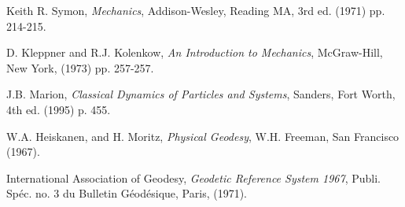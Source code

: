 \documentclass{revtex4}
\begin{document}
\begin{thebibliography}{9}

 Keith R. Symon,
 \emph{Mechanics},
 Addison-Wesley, Reading MA, 
 3rd ed. (1971) pp. 214-215.

 D. Kleppner and R.J. Kolenkow,
 \emph{An Introduction to Mechanics},
 McGraw-Hill, New York,
 (1973) pp. 257-257.

 J.B. Marion,
 \emph{Classical Dynamics of Particles and Systems},
 Sanders, Fort Worth,
 4th ed. (1995) p. 455.

 W.A. Heiskanen, and H. Moritz,
 \emph{Physical Geodesy},
 W.H. Freeman, San Francisco
 (1967).

 International Association of Geodesy,
 \emph{Geodetic Reference System 1967},
 Publi. Sp\'{e}c. no. 3 du Bulletin G\'{e}od\'{e}sique, Paris,
 (1971).

\end{thebibliography}
\end{document}
